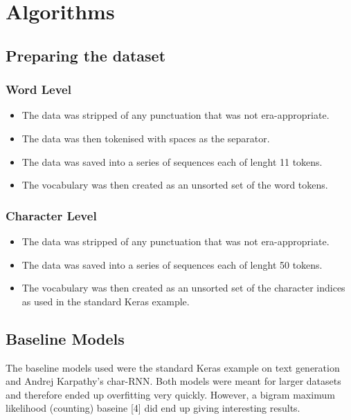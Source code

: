 \documentclass[15pt]{article}
\begin{document}

\section{Algorithms}
\subsection{Preparing the dataset}
\subsubsection{Word Level}
\begin{itemize}
\item The data was stripped of any punctuation that was not era-appropriate.
\item The data was then tokenised with spaces as the separator.
\item The data was saved into a series of sequences each of lenght 11 tokens.
\item The vocabulary was then created as an unsorted set of the word tokens.
\end{itemize}
\subsubsection{Character Level}
\begin{itemize}
\item The data was stripped of any punctuation that was not era-appropriate.
\item The data was saved into a series of sequences each of lenght 50 tokens.
\item The vocabulary was then created as an unsorted set of the character indices as used in the standard Keras example.
\end{itemize}


\subsection*{Baseline Models}
The baseline models used were the standard Keras example on text generation and Andrej Karpathy's char-RNN. Both models were meant for larger datasets and therefore ended up overfitting very quickly. However, a  bigram maximum likelihood (counting) baseine [4] did end up giving interesting results.
\end{document}
